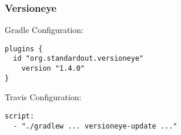 
\begin{frame}[fragile] \frametitle{Versioneye} 
Gradle Configuration:

\begin{lstlisting}
plugins {
  id "org.standardout.versioneye"
    version "1.4.0"
}
\end{lstlisting}
\pause

Travis Configuration:

\begin{lstlisting}
script:
  - "./gradlew ... versioneye-update ..."
\end{lstlisting}
  
\end{frame}


